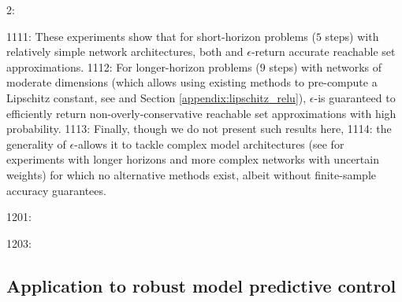 2: \documentclass[12pt]{l4dc2022} %
\begin{document}
1111: These experiments show that for short-horizon problems ($5$ steps) with relatively simple network architectures, both \reachlp and $\epsilon$-\randup return accurate reachable set approximations. 
1112: For longer-horizon problems ($9$ steps) with networks of moderate dimensions (which allows using existing methods to pre-compute a Lipschitz constant, see \citep{Fazlyab2019} and Section \ref{appendix:lipschitz_relu}), $\epsilon$-\randup is guaranteed to  efficiently return non-overly-conservative reachable set approximations with high probability. %
1113: Finally, though we do not present such results here, 
1114: the generality of $\epsilon$-\randup allows it to tackle complex model architectures (see \citep{LewEtAl2022} for experiments with longer horizons and more complex networks with uncertain weights) for which no alternative methods exist, albeit without finite-sample accuracy guarantees. 

1201: \vspace{-1mm}

1203: \subsection{Application to robust model predictive control}\label{sec:results:mpc}
\end{document}
